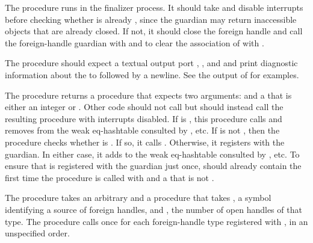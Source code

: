 The  procedure runs in the finalizer process.
It should take  and disable interrupts before checking whether
 is already ,
since the guardian may return inaccessible objects that are already closed.
If not, it should close the foreign handle and call the foreign-handle guardian
with  and  to clear the association of  with .

The  procedure should expect a textual output port ,
, and  and print diagnostic information about the
 to  followed by a newline.
See the output of  for examples.

The  procedure returns a procedure
that expects two arguments:  and a  that is
either an integer or .
Other code should not call  but should instead
call the resulting procedure with interrupts disabled.
If  is , this procedure calls
and removes  from the weak eq-hashtable consulted by
, etc.
If  is not , then
the procedure checks whether 
is .
If so, it calls .
Otherwise, it registers  with the guardian.
In either case, it adds  to the weak eq-hashtable
consulted by , etc.
To ensure that  is registered with the guardian just once,
 should already contain  the first time
the procedure is called with  and a  that
is not .

\begin{procedure}
\end{procedure}
\returns{} 

The  procedure takes an arbitrary  and a
procedure  that takes , a symbol 
identifying a source of foreign handles, and , the number of
open handles of that type.
The  procedure calls  once for
each foreign-handle type registered with ,
in an unspecified order.

